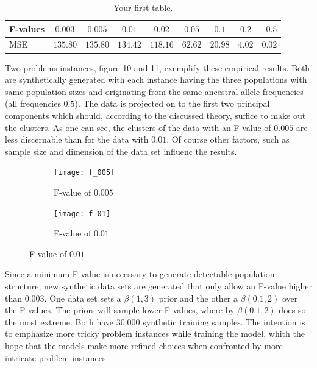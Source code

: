 \documentclass[a4paper, 11pt]{article}
\begin{document}
\begin{table}[h!]
  \begin{center}
    \label{tab:table1}
    \begin{tabular}{l|c|c|c|c|c|c|c|r} %
      \textbf{F-values} & $\mathbf{0.003}$ & $\mathbf{0.005}$ & $\mathbf{0.01}$ & $\mathbf{0.02}$ & $\mathbf{0.05}$ & $\mathbf{0.1}$ & $\mathbf{0.2}$ & $\mathbf{0.5}$\\
      \hline
      MSE & $135.80$ & $135.80$ & $134.42$ & $118.16$ & $62.62$  & $20.98$ & $4.02$ & $0.02$\\
    \end{tabular}
    \caption{Your first table.}
  \end{center}
\end{table}

Two problems instances, figure 10 and 11, exemplify these empirical results. Both are synthetically generated with each instance having the three populations with same population sizes and originating from the same ancestral allele frequencies (all frequencies $0.5$). The data is projected on to the first two principal components which should, according to the discussed theory, suffice to make out the clusters. As one can see, the clusters of the data with an F-value of $0.005$ are less discernable than for the data with $0.01$. Of course other factors, such as sample size and dimension of the data set influenc the results.\\


\begin{figure}
\centering
\begin{subfigure}
\centering
\texttt{[image: f\_005]}
\caption{F-value of $0.005$}
\end{subfigure}
\begin{subfigure}
\centering
\texttt{[image: f\_01]}
\caption{F-value of $0.01$}
\end{subfigure}
\end{figure}

Since a minimum F-value is necessary to generate detectable population structure, new synthetic data sets are generated that only allow an F-value higher than $0.003$. One data set sets a $\beta(1, 3)$ prior and the other a $\beta(0.1, 2)$ over the F-values. The priors will sample lower F-values, where by $\beta(0.1, 2)$ does so the most extreme. Both have $30.000$ synthetic training samples. The intention is to emphasize more tricky problem instances while training the model, whith the hope that the models make more refined choices when confronted by more intricate problem instances.
\\
\end{document}
